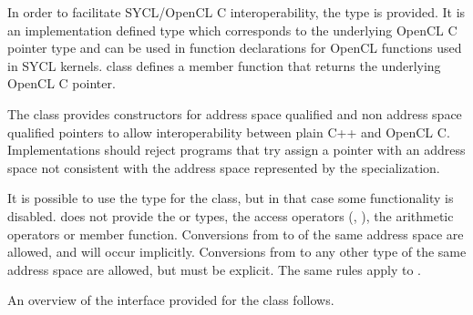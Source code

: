 In order to facilitate SYCL/OpenCL C
interoperability, the  type is provided. It is an
implementation defined type which corresponds to the underlying OpenCL C
pointer type and can be used in  function
declarations for OpenCL functions used in SYCL kernels.
 class defines a  member function that returns the underlying OpenCL C pointer.

The  class provides constructors for address space qualified and non address space qualified pointers to allow interoperability between plain C++ and OpenCL C.
Implementations should reject programs that try assign a pointer with an address space not consistent with the address space represented by the  specialization.

It is possible to use the  type for the 
class, but in that case some functionality is disabled.
 does not provide the  or
 types, the access operators
(, ), the arithmetic
operators or  member function.
Conversions from  to  of the
same address space are allowed, and will occur implicitly.
Conversions from  to any other
 type of the same address space
are allowed, but must be explicit.
The same rules apply to .

An overview of the interface provided for the  class
follows.



